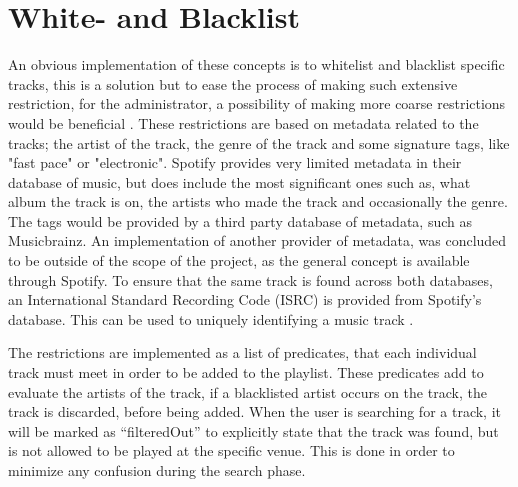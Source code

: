 \section{White- and Blacklist}

An obvious implementation of these concepts is to whitelist and blacklist specific tracks, this is a solution but to ease the process of making such extensive restriction, for the administrator, a possibility of making more coarse restrictions would be beneficial . These restrictions are based on metadata related to the tracks; the artist of the track, the genre of the track and some signature tags, like "fast pace" or "electronic". Spotify provides very limited metadata in their database of music, but does include the most significant ones such as, what album the track is on, the artists who made the track and occasionally the genre. The tags would be provided by a third party database of metadata, such as Musicbrainz. An implementation of another provider of metadata, was concluded to be outside of the scope of the project, as the general concept is available through Spotify. To ensure that the same track is found across both databases, an International Standard Recording Code (ISRC) is provided from Spotify’s database. This can be used to uniquely identifying a music track \cite{isrc}.

The restrictions are implemented as a list of predicates, that each individual track must meet in order to be added to the playlist. These predicates add to evaluate the artists of the track, if a blacklisted artist occurs on the track, the track is discarded, before being added. When the user is searching for a track, it will be marked as \enquote{filteredOut} to explicitly state that the track was found, but is not allowed to be played at the specific venue. This is done in order to minimize any confusion during the search phase.
